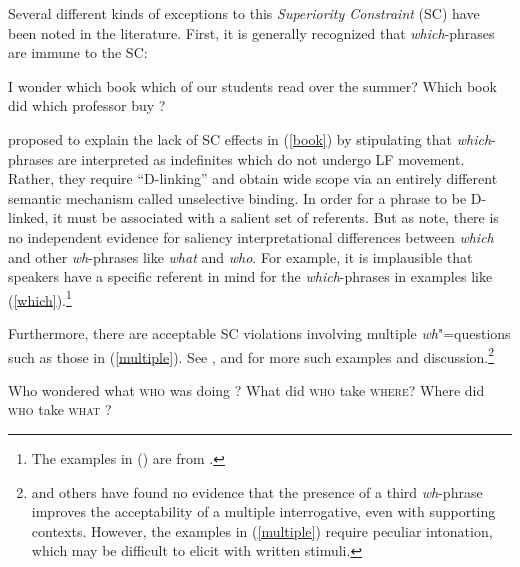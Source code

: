 \documentclass[output=paper
 	        ,biblatex
                ,babelshorthands
                ,newtxmath
                ,draftmode
                ,colorlinks, citecolor=brown
]{langscibook}
\begin{document}
\eal  \label{badsc2}
\zl

Several different kinds of exceptions to this \emph{Superiority Constraint} (SC) have been 
noted in the literature. First, it is generally recognized that \emph{which}-phrases are
immune to the SC:

\eal \label{book}
\ex I wonder which book which of our students read \spc over the summer?
\ex Which book did which professor buy \spc?
\zl

\noindent
\citet{pesetskydlink} proposed to explain the lack of SC effects in (\ref{book}) by stipulating that
\emph{which}-phrases are interpreted as indefinites which do not undergo LF movement. Rather, they
require ``D-linking'' and obtain wide scope via an entirely different semantic mechanism called
unselective binding. In order for a phrase to be D-linked, it must be associated with a salient set
of referents. But as \citet[248]{ginzsag} note, there is no independent evidence for saliency
interpretational differences between \emph{which} and other \emph{wh}-phrases like \emph{what} and
\emph{who}. For example, it is implausible that speakers have a specific referent in mind for the
\emph{which}-phrases in examples like (\ref{which}).\footnote{
The examples in () are from .}

\eal  \label{which}
\zl



Furthermore, there are acceptable SC violations involving multiple \emph{wh}"=questions such as
those in (\ref{multiple}). See \citet{Bolinger78}, \citet{kayne83} and \citet[109]{pesetskydlink}
for more such examples and discussion.\footnote{\citet{gibson10} and others have found no evidence
  that the presence of a third \emph{wh}-phrase improves the acceptability of a multiple
  interrogative, even with supporting contexts. However, the examples in (\ref{multiple}) require
  peculiar intonation, which may be difficult to elicit with written stimuli.}

\eal \label{multiple}
\ex Who wondered what \textsc{who} was doing \spc?
\ex What did \textsc{who} take \spcs \textsc{where}?
\ex Where did \textsc{who} take \textsc{what} \spc?
\zl
\end{document}
